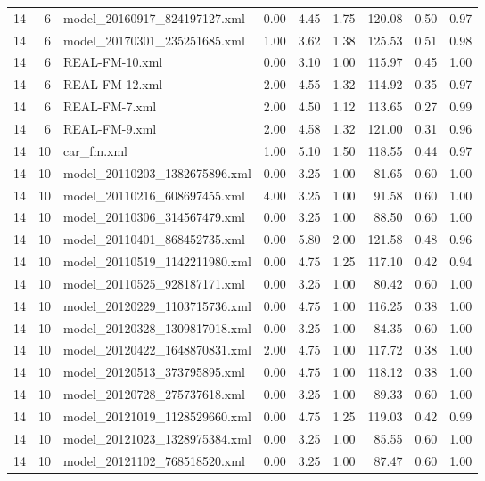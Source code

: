 \begin{table}[ht]
\begin{tabular}{rrlrrrrrr}
   14 &   6 & model\_20160917\_824197127.xml & 0.00 & 4.45 & 1.75 & 120.08 & 0.50 & 0.97 \\ 
   14 &   6 & model\_20170301\_235251685.xml & 1.00 & 3.62 & 1.38 & 125.53 & 0.51 & 0.98 \\ 
   14 &   6 & REAL-FM-10.xml & 0.00 & 3.10 & 1.00 & 115.97 & 0.45 & 1.00 \\ 
   14 &   6 & REAL-FM-12.xml & 2.00 & 4.55 & 1.32 & 114.92 & 0.35 & 0.97 \\ 
   14 &   6 & REAL-FM-7.xml & 2.00 & 4.50 & 1.12 & 113.65 & 0.27 & 0.99 \\ 
   14 &   6 & REAL-FM-9.xml & 2.00 & 4.58 & 1.32 & 121.00 & 0.31 & 0.96 \\ 
   14 &  10 & car\_fm.xml & 1.00 & 5.10 & 1.50 & 118.55 & 0.44 & 0.97 \\ 
   14 &  10 & model\_20110203\_1382675896.xml & 0.00 & 3.25 & 1.00 & 81.65 & 0.60 & 1.00 \\ 
   14 &  10 & model\_20110216\_608697455.xml & 4.00 & 3.25 & 1.00 & 91.58 & 0.60 & 1.00 \\ 
   14 &  10 & model\_20110306\_314567479.xml & 0.00 & 3.25 & 1.00 & 88.50 & 0.60 & 1.00 \\ 
   14 &  10 & model\_20110401\_868452735.xml & 0.00 & 5.80 & 2.00 & 121.58 & 0.48 & 0.96 \\ 
   14 &  10 & model\_20110519\_1142211980.xml & 0.00 & 4.75 & 1.25 & 117.10 & 0.42 & 0.94 \\ 
   14 &  10 & model\_20110525\_928187171.xml & 0.00 & 3.25 & 1.00 & 80.42 & 0.60 & 1.00 \\ 
   14 &  10 & model\_20120229\_1103715736.xml & 0.00 & 4.75 & 1.00 & 116.25 & 0.38 & 1.00 \\ 
   14 &  10 & model\_20120328\_1309817018.xml & 0.00 & 3.25 & 1.00 & 84.35 & 0.60 & 1.00 \\ 
   14 &  10 & model\_20120422\_1648870831.xml & 2.00 & 4.75 & 1.00 & 117.72 & 0.38 & 1.00 \\ 
   14 &  10 & model\_20120513\_373795895.xml & 0.00 & 4.75 & 1.00 & 118.12 & 0.38 & 1.00 \\ 
   14 &  10 & model\_20120728\_275737618.xml & 0.00 & 3.25 & 1.00 & 89.33 & 0.60 & 1.00 \\ 
   14 &  10 & model\_20121019\_1128529660.xml & 0.00 & 4.75 & 1.25 & 119.03 & 0.42 & 0.99 \\ 
   14 &  10 & model\_20121023\_1328975384.xml & 0.00 & 3.25 & 1.00 & 85.55 & 0.60 & 1.00 \\ 
   14 &  10 & model\_20121102\_768518520.xml & 0.00 & 3.25 & 1.00 & 87.47 & 0.60 & 1.00 \\ 

\end{tabular}
\end{table}
